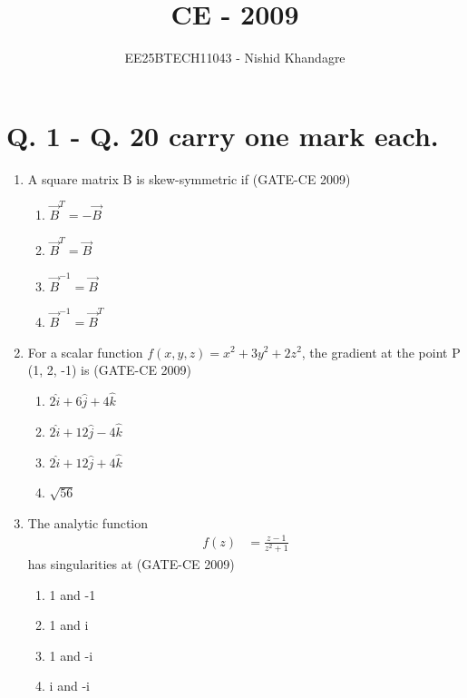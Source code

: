 \documentclass[journal,12pt,onecolumn]{article}
\theoremstyle{remark}
\begin{document}
\title{CE - 2009}
\author{EE25BTECH11043 - Nishid Khandagre}
\date{}
\maketitle

\renewcommand{\thefigure}{\theenumi}
\renewcommand{\thetable}{\theenumi}


\section*{Q. 1 - Q. 20 carry one mark each.}
\begin{enumerate}
    \item A square matrix B is skew-symmetric if (GATE-CE 2009)
    \begin{multicols}{2}
    \begin{enumerate}
        \item $\vec{B}^T = -\vec{B}$ 
        \item $\vec{B}^T = \vec{B}$ 
        \item $\vec{B}^{-1} = \vec{B}$ 
        \item $\vec{B}^{-1} = \vec{B}^T$
    \end{enumerate}
    \end{multicols}
    
    \item For a scalar function $f(x, y, z) = x^2 + 3y^2 + 2z^2$, the gradient at the point P (1, 2, -1) is (GATE-CE 2009)
    \begin{multicols}{2}
    \begin{enumerate}
        \item $2\hat{i} + 6\hat{j}+ 4\hat{k}$
        \item $2\hat{i} + 12\hat{j} - 4\hat{k}$
        \item $2\hat{i} + 12\hat{j} + 4\hat{k}$
        \item $\sqrt{56}$
    \end{enumerate}
    \end{multicols}
    
    \item The analytic function
\begin{align}
f(z) &= \frac{z-1}{z^2+1}
\end{align}
has singularities at (GATE-CE 2009)
    \begin{multicols}{2}
    \begin{enumerate}
        \item 1 and -1 
        \item 1 and i 
        \item 1 and -i 
        \item i and -i
    \end{enumerate}
    \end{multicols}
    

\end{enumerate}
\end{document}
